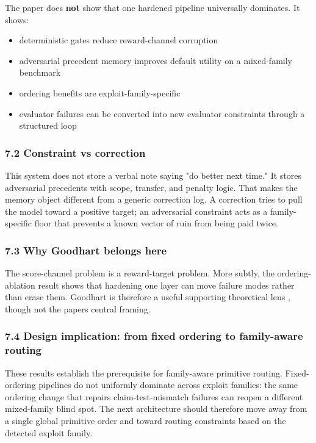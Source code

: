 \documentclass[
]{article}
\providecommand{\tightlist}{%
  \setlength{\itemsep}{0pt}\setlength{\parskip}{0pt}}
\begin{document}
The paper does \textbf{not} show that one hardened pipeline universally
dominates. It shows:

\begin{itemize}
\tightlist
\item
  deterministic gates reduce reward-channel corruption
\item
  adversarial precedent memory improves default utility on a
  mixed-family benchmark
\item
  ordering benefits are exploit-family-specific
\item
  evaluator failures can be converted into new evaluator constraints
  through a structured loop
\end{itemize}

\subsubsection{7.2 Constraint vs
correction}\label{72-constraint-vs-correction}

This system does not store a verbal note saying "do better next time."
It stores adversarial precedents with scope, transfer, and penalty
logic. That makes the memory object different from a generic correction
log. A correction tries to pull the model toward a positive target; an
adversarial constraint acts as a family-specific floor that prevents a
known vector of ruin from being paid twice.

\subsubsection{7.3 Why Goodhart belongs
here}\label{73-why-goodhart-belongs-here}

The score-channel problem is a reward-target problem. More subtly, the
ordering-ablation result shows that hardening one layer can move failure
modes rather than erase them. Goodhart is therefore a useful supporting
theoretical lens \citep{manheim2019goodhart}, though not the paper\textquotesingle s central
framing.

\subsubsection{7.4 Design implication: from fixed ordering to
family-aware
routing}\label{74-design-implication-from-fixed-ordering-to-family-aware-routing}

These results establish the prerequisite for family-aware primitive
routing. Fixed-ordering pipelines do not uniformly dominate across
exploit families: the same ordering change that repairs
claim-test-mismatch failures can reopen a different mixed-family blind
spot. The next architecture should therefore move away from a single
global primitive order and toward routing constraints based on the
detected exploit family.
\end{document}
